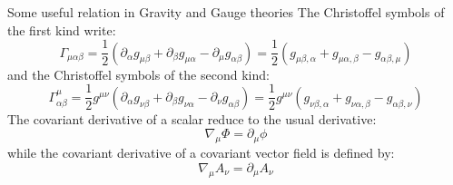 \begin{section}{Some useful relation in Gravity and Gauge theories}
  The Christoffel symbols of the first kind write:
  \begin{equation}
    \Gamma_{\mu \alpha \beta} = \frac{1}{2}\left(\partial_\alpha g_{\mu \beta}+\partial_\beta g_{\mu \alpha}-\partial_\mu g_{\alpha \beta}\right) = \frac{1}{2}\left(g_{\mu \beta,\alpha}+g_{\mu \alpha,\beta}-g_{\alpha \beta,\mu}\right)
  \end{equation}
  and the Christoffel symbols of the second kind:
  \begin{equation}
    \Gamma^{\mu}_{\alpha \beta} = \frac{1}{2}g^{\mu \nu}\left(\partial_\alpha g_{\nu \beta}+\partial_\beta g_{\nu \alpha}-\partial_\nu g_{\alpha \beta}\right) = \frac{1}{2}g^{\mu \nu}\left(g_{\nu \beta,\alpha}+g_{\nu \alpha,\beta}-g_{\alpha \beta,\nu}\right)
  \end{equation}
  The covariant derivative of a scalar reduce to the usual derivative:
  \begin{equation}
    \nabla_\mu\Phi = \partial_\mu\phi
  \end{equation}
  while the covariant derivative of a covariant vector field is defined by:
  \begin{equation}
    \nabla_\mu A_\nu = \partial_\mu A_\nu
  \end{equation}
\end{section}

